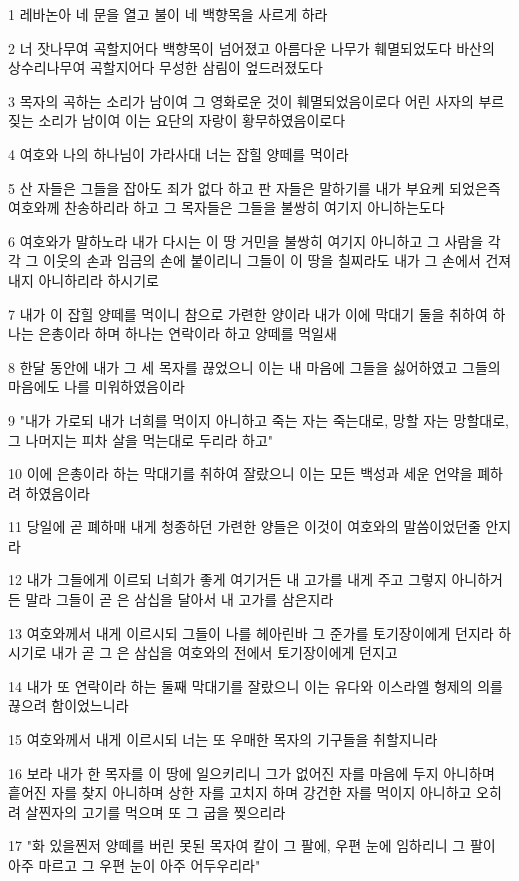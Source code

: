 \par 1 레바논아 네 문을 열고 불이 네 백향목을 사르게 하라
\par 2 너 잣나무여 곡할지어다 백향목이 넘어졌고 아름다운 나무가 훼멸되었도다 바산의 상수리나무여 곡할지어다 무성한 삼림이 엎드러졌도다
\par 3 목자의 곡하는 소리가 남이여 그 영화로운 것이 훼멸되었음이로다 어린 사자의 부르짖는 소리가 남이여 이는 요단의 자랑이 황무하였음이로다
\par 4 여호와 나의 하나님이 가라사대 너는 잡힐 양떼를 먹이라
\par 5 산 자들은 그들을 잡아도 죄가 없다 하고 판 자들은 말하기를 내가 부요케 되었은즉 여호와께 찬송하리라 하고 그 목자들은 그들을 불쌍히 여기지 아니하는도다
\par 6 여호와가 말하노라 내가 다시는 이 땅 거민을 불쌍히 여기지 아니하고 그 사람을 각각 그 이웃의 손과 임금의 손에 붙이리니 그들이 이 땅을 칠찌라도 내가 그 손에서 건져내지 아니하리라 하시기로
\par 7 내가 이 잡힐 양떼를 먹이니 참으로 가련한 양이라 내가 이에 막대기 둘을 취하여 하나는 은총이라 하며 하나는 연락이라 하고 양떼를 먹일새
\par 8 한달 동안에 내가 그 세 목자를 끊었으니 이는 내 마음에 그들을 싫어하였고 그들의 마음에도 나를 미워하였음이라
\par 9 "내가 가로되 내가 너희를 먹이지 아니하고 죽는 자는 죽는대로, 망할 자는 망할대로, 그 나머지는 피차 살을 먹는대로 두리라 하고"
\par 10 이에 은총이라 하는 막대기를 취하여 잘랐으니 이는 모든 백성과 세운 언약을 폐하려 하였음이라
\par 11 당일에 곧 폐하매 내게 청종하던 가련한 양들은 이것이 여호와의 말씀이었던줄 안지라
\par 12 내가 그들에게 이르되 너희가 좋게 여기거든 내 고가를 내게 주고 그렇지 아니하거든 말라 그들이 곧 은 삼십을 달아서 내 고가를 삼은지라
\par 13 여호와께서 내게 이르시되 그들이 나를 헤아린바 그 준가를 토기장이에게 던지라 하시기로 내가 곧 그 은 삼십을 여호와의 전에서 토기장이에게 던지고
\par 14 내가 또 연락이라 하는 둘째 막대기를 잘랐으니 이는 유다와 이스라엘 형제의 의를 끊으려 함이었느니라
\par 15 여호와께서 내게 이르시되 너는 또 우매한 목자의 기구들을 취할지니라
\par 16 보라 내가 한 목자를 이 땅에 일으키리니 그가 없어진 자를 마음에 두지 아니하며 흩어진 자를 찾지 아니하며 상한 자를 고치지 하며 강건한 자를 먹이지 아니하고 오히려 살찐자의 고기를 먹으며 또 그 굽을 찢으리라
\par 17 "화 있을찐저 양떼를 버린 못된 목자여 칼이 그 팔에, 우편 눈에 임하리니 그 팔이 아주 마르고 그 우편 눈이 아주 어두우리라"

